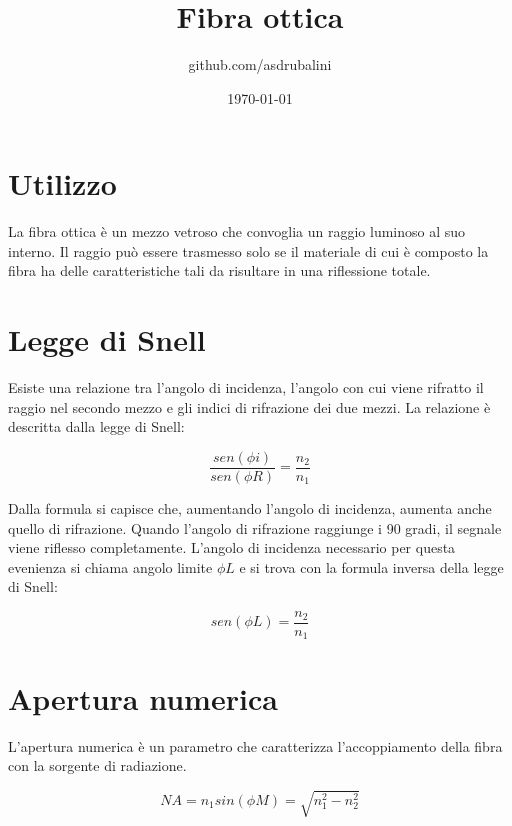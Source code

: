 \documentclass{article}
\title{Fibra ottica}
\author{github.com/asdrubalini}
\date{\today}
\begin{document}
    \maketitle

    \section{Utilizzo}

    La fibra ottica è un mezzo vetroso che convoglia un raggio luminoso al suo interno. 
    Il raggio può essere trasmesso solo se il materiale di cui è composto la fibra ha delle caratteristiche
    tali da risultare in una riflessione totale.

    \section{Legge di Snell}

    Esiste una relazione tra l'angolo di incidenza, l'angolo con cui viene rifratto il raggio nel secondo mezzo e gli indici di
    rifrazione dei due mezzi. La relazione è descritta dalla legge di Snell:

    \begin{equation}
        \frac{sen (\phi i)}{sen (\phi R)} = \frac{n_2}{n_1}
    \end{equation}

    Dalla formula si capisce che, aumentando l'angolo di incidenza, aumenta anche quello di rifrazione. Quando l'angolo di rifrazione
    raggiunge i 90 gradi, il segnale viene riflesso completamente. L'angolo di incidenza necessario per questa evenienza si chiama
    angolo limite $\phi L$ e si trova con la formula inversa della legge di Snell:

    \begin{equation}
        sen (\phi L) = \frac{n_2}{n_1}
    \end{equation}

    \section{Apertura numerica}

    L'apertura numerica è un parametro che caratterizza l'accoppiamento della fibra con la sorgente di radiazione.

    \begin{equation}
        NA = n_1 sin(\phi M) = \sqrt{n_1^2 - n_2^2}
    \end{equation}
\end{document}
